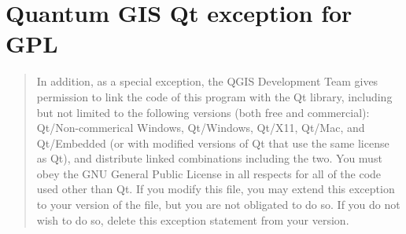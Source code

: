 \chapter{Quantum GIS Qt exception for GPL}\label{qgis_qt_exception_appendix}

\begin{quotation}
In addition, as a special exception, the QGIS Development Team gives
permission to link the code of this program with the Qt library,
including but not limited to the following versions (both free and
commercial): Qt/Non-commerical Windows, Qt/Windows, Qt/X11, Qt/Mac, and
Qt/Embedded (or with modified versions of Qt that use the same license
as Qt), and distribute linked combinations including the two. You must
obey the GNU General Public License in all respects for all of the code
used other than Qt. If you modify this file, you may extend this
exception to your version of the file, but you are not obligated to do
so. If you do not wish to do so, delete this exception statement from
your version.
\end{quotation} 
